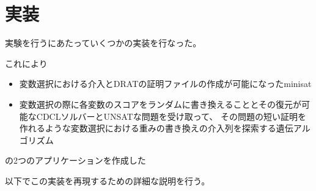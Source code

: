 \section{実装}





実験を行うにあたっていくつかの実装を行なった。

\begin{comment}
まず最初にminisatに対しての2種類のオプションを可能にする改造を行なった。
どちらのオプションもファイル名を指定して使用するオプションである。
1つ目のオプションが使用された場合、問題を解く前にminisatは指定されたファイル名のファイルを新規で作成する。
minisatが問題を解く中で新しく節を作成した場合に指定したファイルにその節を追加したという情報を書き込み、
節を削除した場合には指定したファイルその節を削除したという情報を書き込む操作が行われるようにminisatを改造した。
2つ目のオプションが使用された場合、問題を解く前にminisatは指定されたファイルを読み込んでそこからどのような介入を行うかのデータを記憶する。
この介入は何回目の変数選択の際にどのように変数のスコアを書き換えるかという情報を表している。
そして、minisatが問題を解く中で変数選択の回数が指定した回数になった場合、指定した方法で変数のスコアを書き換えるようにminisatを改造した。

次に遺伝アルゴリズムを実行するプログラムの作成を行なった。
このプログラムはCDCLソルバーとUNSATな問題とその他遺伝アルゴリズムに必要なパラメータの情報を受け取る。
これらを受け取った後、プログラムは介入の列で表現される染色体からなる初期の集団を作成し、
そこから交叉と突然変異を用いながら、
指定した問題を指定したCDCLソルバーが解いた際に短い証明を作成できるような介入列の探索を行う。
\end{comment}

これにより
\begin{itemize}
	\item 変数選択における介入とDRATの証明ファイルの作成が可能になったminisat
	\item 変数選択の際に各変数のスコアをランダムに書き換えることとその復元が可能なCDCLソルバーとUNSATな問題を受け取って、
	      その問題の短い証明を作れるような変数選択における重みの書き換えの介入列を探索する遺伝アルゴリズム
\end{itemize}
の2つのアプリケーションを作成した

以下でこの実装を再現するための詳細な説明を行う。





